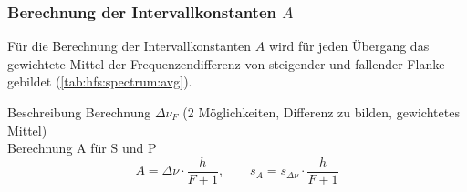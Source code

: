 \subsubsection*{Berechnung der Intervallkonstanten $A$}
Für die Berechnung der Intervallkonstanten $A$ wird für jeden Übergang das gewichtete Mittel der Frequenzendifferenz von steigender und fallender 
Flanke gebildet (\autoref{tab:hfs:spectrum:avg}).

Beschreibung Berechnung $\Delta \nu_F$ (2 Möglichkeiten, Differenz zu bilden, gewichtetes Mittel) \\
Berechnung A für S und P
\begin{equation}
    A = \Delta \nu \cdot \frac{h}{F + 1}, \qquad s_A = s_{\Delta \nu} \cdot \frac{h}{F + 1}
\end{equation}
